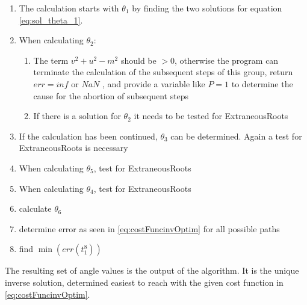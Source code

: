 \begin{enumerate}
	\item The calculation starts with $\theta_1$ by finding the two solutions for equation \ref{eq:sol_theta_1}.
	\item When calculating $\theta_2$:
	\begin{enumerate}
		\item  The term $ v^2 + u^2 - m^2 $ should be $ > 0$, otherwise the program can terminate the calculation of the subsequent steps of this group, return $err = inf $ or $NaN $ , and provide a variable like $P=1$ to determine the cause for the abortion of subsequent steps
		\item If there is a solution for $\theta_2$ it needs to be tested for \glspl{ExtraneousRoot}
	\end{enumerate}
	\item If the calculation has been continued, $\theta_3$ can be determined. Again a test for \glspl{ExtraneousRoot} is necessary
	\item When calculating $\theta_5$, test for \glspl{ExtraneousRoot}
	\item When calculating $\theta_4$, test for \glspl{ExtraneousRoot}
	\item calculate $\theta_6$
	\item determine error as seen in \ref{eq:costFuncinvOptim} for all possible paths
	\item find $\min ( err(t_1^8))$ 
\end{enumerate}

The resulting set of angle values is the output of the algorithm. It is the unique inverse solution, determined easiest to reach with the given cost function in \ref{eq:costFuncinvOptim}. 






